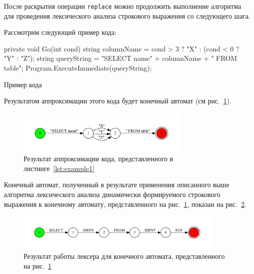 \documentclass{matmex-diploma}
\begin{document}
После раскрытия операции \verb|replace| можно продолжить выполнение алгоритма для проведения лексического анализа строкового выражения со следующего шага. 

Рассмотрим следующий пример кода:

\begin{listing}[H]
    \begin{pyglist}[language=csharp,numbers=left,numbersep=5pt]
 private void Go(int cond){
   string columnName = cond > 3 ? "X" : (cond < 0 ? "Y" : "Z");
   string queryString = "SELECT name" + columnName + " FROM table";
   Program.ExecuteImmediate(queryString);}
    \end{pyglist}
\caption{Пример кода}
\label{lst:example1}
\end{listing}

Результатом аппроксимации этого кода будет конечный автомат (см рис.~\ref{fig:example_appr}).

\begin{figure}[H]
\begin{center}
\includegraphics[width=0.75\textwidth]{tsql_test}
\caption{Результат аппроксимации кода, представленного в листинге~\ref{lst:example1}}
\label{fig:example_appr} 
\end{center}
\end{figure}

Конечный автомат, полученный в результате применения описанного выше алгоритма лексического анализа динамически формируемого строкового выражения к конечному автомату, представленного на рис.~\ref{fig:example_appr}, показан на рис.~\ref{fig:example_lexer}.

\begin{figure}[h!]
\begin{center}
\includegraphics[width=0.9\textwidth]{tsql_test_appr}
\caption{Результат работы лексера для конечного автомата, представленного на рис.~\ref{fig:example_appr}}
\label{fig:example_lexer} 
\end{center}
\end{figure}
\end{document}
